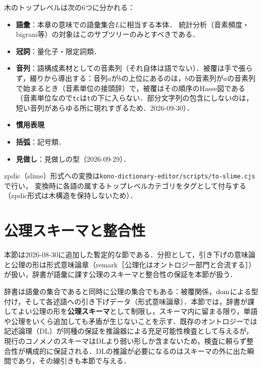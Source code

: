 \documentclass[../../main-detail.tex]{subfiles}
\begin{document}
木のトップレベルは次の6つに分かれる：
\begin{itemize}
    \item \textbf{語彙}：本章の意味での語彙集合$L$に相当する本体．
    統計分析（音素頻度・bigram等）の対象はこのサブツリーのみとすべきである．
    \item \textbf{冠詞}：量化子・限定詞類．
    \item \textbf{音列}：語構成素材としての音素列（それ自体は語でない）．被覆は手で張らず，綴りから導出する：音列$a$が$b$の上位にあるのは，$b$の音素列が$a$の音素列で始まるとき（音素単位の接頭辞）で，被覆はその順序のHasse図である（音素単位なので\texttt{tc}は\texttt{t}の下に入らない．部分文字列の包含にしないのは，短い音列があらゆる所に現れすぎるため．2026-09-30）．
    \item \textbf{慣用表現}
    \item \textbf{括弧}：記号類．
    \item \textbf{見做し}：見做しの型（2026-09-29）．
\end{itemize}
zpdic（slime）形式への変換は\texttt{kono-dictionary-editor/scripts/to-slime.cjs}で行い，
変換時に各語の属するトップレベルカテゴリをタグとして付与する
（zpdic形式は木構造を保持しないため）．

\section{公理スキーマと整合性}\label{sec:axiom-schema}
本節は2026-08-30に追加した暫定的な節である．分担として，引き下げの意味論と公理の形は形式意味論章（remark［公理化はオントロジー部門と合流する］）が扱い，辞書が語彙に課す公理のスキーマと整合性の保証を本節が扱う．

辞書は語彙の集合であると同時に公理の集合でもある：被覆関係，$\mathop{\mathrm{dom}}\nolimits$による型付け，そして各述語への引き下げデータ（形式意味論章）．本節では，辞書が課してよい公理の形を\textbf{公理スキーマ}として制限し，スキーマ内に留まる限り，単語や公理をいくら追加しても矛盾が生じないことを示す．既存のオントロジーでは記述論理（DL）\cite{dl-handbook}が同種の保証を推論器による充足可能性検査として与えるが，現行のコノメノのスキーマはDLより弱い形しか含まないため，検査に頼らず整合性が構成的に保証される．DLの推論が必要になるのはスキーマの外に出た瞬間であり，その線引きも本節で与える．
\end{document}
